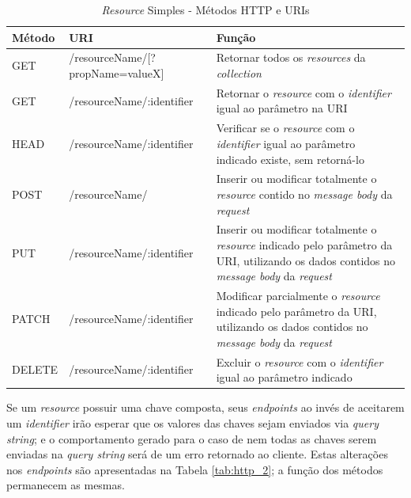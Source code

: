 \begin{table}[]
    \centering
    \begin{tabularx}{\textwidth}{|l|l|X|}
        \hline
        \textbf{Método} & \textbf{URI} & \textbf{Função} \\
        \hline

        GET & /resourceName/[?propName=valueX]            & Retornar todos os \textit{resources} da \textit{collection}\\
        \hline

        GET & /resourceName/:identifier & Retornar o \textit{resource} com o \textit{identifier} igual ao parâmetro na URI\\
        \hline

        HEAD & /resourceName/:identifier & Verificar se o \textit{resource} com o \textit{identifier} igual ao parâmetro indicado existe, sem retorná-lo\\
        \hline

        POST & /resourceName/ & Inserir ou modificar totalmente o \textit{resource} contido no \textit{message body} da \textit{request}\\
        \hline

        PUT & /resourceName/:identifier & Inserir ou modificar totalmente o \textit{resource} indicado pelo parâmetro da URI, utilizando os dados contidos no \textit{message body} da \textit{request}\\
        \hline

        PATCH & /resourceName/:identifier & Modificar parcialmente o \textit{resource} indicado pelo parâmetro da URI, utilizando os dados contidos no \textit{message body} da \textit{request}\\
        \hline

        DELETE & /resourceName/:identifier & Excluir o \textit{resource} com o \textit{identifier} igual ao parâmetro indicado\\
        \hline
    \end{tabularx}
    \caption{\textit{Resource} Simples - Métodos HTTP e URIs}
    \label{tab:http_1}
\end{table}

Se um \textit{resource} possuir uma chave composta, seus \textit{endpoints} ao invés de aceitarem um \textit{identifier} irão esperar que os valores das chaves sejam enviados via \textit{query string}; e o comportamento gerado para o caso de nem todas as chaves serem enviadas na \textit{query string} será de um erro retornado ao cliente. Estas alterações nos \textit{endpoints} são apresentadas na Tabela \ref{tab:http_2}; a função dos métodos permanecem as mesmas.

